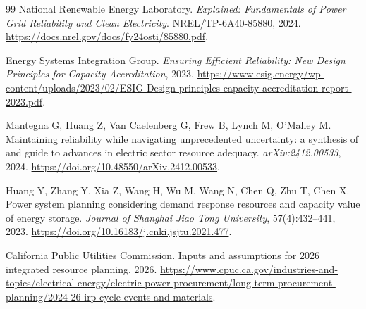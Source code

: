 \documentclass[UTF8,fontset=fandol,12pt]{ctexart}
\begin{document}
\begin{thebibliography}{99}
National Renewable Energy Laboratory.
\newblock \emph{Explained: Fundamentals of Power Grid Reliability and Clean
Electricity}. NREL/TP-6A40-85880, 2024.
\newblock \url{https://docs.nrel.gov/docs/fy24osti/85880.pdf}.

Energy Systems Integration Group.
\newblock \emph{Ensuring Efficient Reliability: New Design Principles for
Capacity Accreditation}, 2023.
\newblock \url{https://www.esig.energy/wp-content/uploads/2023/02/ESIG-Design-principles-capacity-accreditation-report-2023.pdf}.

Mantegna G, Huang Z, Van Caelenberg G, Frew B, Lynch M, O'Malley M.
\newblock Maintaining reliability while navigating unprecedented uncertainty:
a synthesis of and guide to advances in electric sector resource adequacy.
\newblock \emph{arXiv:2412.00533}, 2024.
\newblock \url{https://doi.org/10.48550/arXiv.2412.00533}.

Huang Y, Zhang Y, Xia Z, Wang H, Wu M, Wang N, Chen Q, Zhu T, Chen X.
\newblock Power system planning considering demand response resources and
capacity value of energy storage.
\newblock \emph{Journal of Shanghai Jiao Tong University},
57(4):432--441, 2023.
\newblock \url{https://doi.org/10.16183/j.cnki.jsjtu.2021.477}.

California Public Utilities Commission.
\newblock Inputs and assumptions for 2026 integrated resource planning, 2026.
\newblock \url{https://www.cpuc.ca.gov/industries-and-topics/electrical-energy/electric-power-procurement/long-term-procurement-planning/2024-26-irp-cycle-events-and-materials}.

\end{thebibliography}
\end{document}
